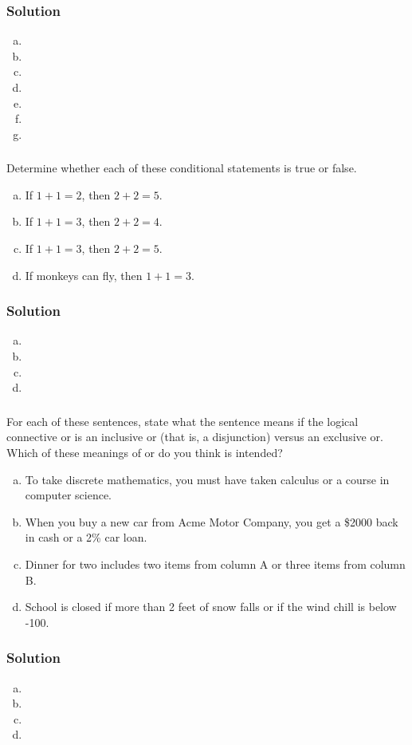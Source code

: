 \documentclass[11pt,a4paper]{article}
\newcommand{\problem}[1]{%
\setcounter{subsubsection}{#1}%
\addtocounter{subsubsection}{-1}%
\subsubsection{\hfill}%
}
\newcommand{\solution}{%
\subsubsection*{Solution}%
}
\begin{document}
		\solution{}
			\begin{enumerate}[a)]
				\item 
				\item 
				\item 
				\item 
				\item 
				\item 
				\item 
			\end{enumerate}
		\problem{17}
			Determine whether each of these conditional statements is true or false.
			\begin{enumerate}[a)]
				\item If $1 + 1 = 2$, then $2 + 2 = 5$.
				\item If $1 + 1 = 3$, then $2 + 2 = 4$.
				\item If $1 + 1 = 3$, then $2 + 2 = 5$.
				\item If monkeys can fly, then $1 + 1 = 3$.
			\end{enumerate}
		\solution{}
			\begin{enumerate}[a)]
				\item 
				\item 
				\item 
				\item 
			\end{enumerate}
		\problem{21}
			For each of these sentences, state what the sentence means if the logical connective or is an inclusive or (that is, a disjunction) versus an exclusive or. Which of these meanings of or do you think is intended?
			\begin{enumerate}[a)]
				\item To take discrete mathematics, you must have taken calculus or a course in computer science.
				\item When you buy a new car from Acme Motor Company, you get a \$2000 back in cash or a 2\% car loan.
				\item Dinner for two includes two items from column A or three items from column B.
				\item School is closed if more than 2 feet of snow falls or if the wind chill is below -100.
			\end{enumerate}
		\solution{}
			\begin{enumerate}[a)]
				\item 
				\item 
				\item 
				\item 
			\end{enumerate}
\end{document}
